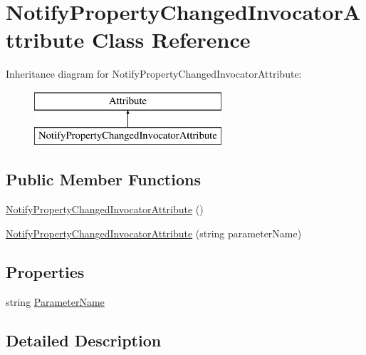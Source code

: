 \hypertarget{class_notify_property_changed_invocator_attribute}{}\section{Notify\+Property\+Changed\+Invocator\+Attribute Class Reference}
\label{class_notify_property_changed_invocator_attribute}
Inheritance diagram for Notify\+Property\+Changed\+Invocator\+Attribute\+:\begin{figure}[H]
\begin{center}
\leavevmode
\includegraphics[height=2.000000cm]{class_notify_property_changed_invocator_attribute}
\end{center}
\end{figure}
\subsection*{Public Member Functions}
\begin{DoxyCompactItemize}
\item 
\hyperlink{class_notify_property_changed_invocator_attribute_a74986b0d8e8b310ba92cd038ca58771f}{Notify\+Property\+Changed\+Invocator\+Attribute} ()
\item 
\hyperlink{class_notify_property_changed_invocator_attribute_a53ea804fe542cdfff5c0ffbb47fdaeb0}{Notify\+Property\+Changed\+Invocator\+Attribute} (string parameter\+Name)
\end{DoxyCompactItemize}
\subsection*{Properties}
\begin{DoxyCompactItemize}
\item 
string \hyperlink{class_notify_property_changed_invocator_attribute_a156a54b467974741191e07b4812442ac}{Parameter\+Name}
\end{DoxyCompactItemize}


\subsection{Detailed Description}


